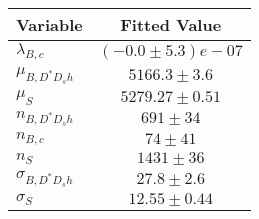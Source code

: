 \begin{tabular}[t]{lc}
\hline
Variable &Fitted Value\\
\hline\hline
$\lambda_{B,c}$&$(-0.0\pm5.3)e-07$\\
\hline
$\mu_{B, D^* D_s h}$&$5166.3\pm3.6$\\
\hline
$\mu_S$&$5279.27\pm0.51$\\
\hline
$n_{B, D^* D_s h}$&$691\pm34$\\
\hline
$n_{B,c}$&$74\pm41$\\
\hline
$n_S$&$1431\pm36$\\
\hline
$\sigma_{B, D^* D_s h}$&$27.8\pm2.6$\\
\hline
$\sigma_S$&$12.55\pm0.44$\\
\hline
\end{tabular}